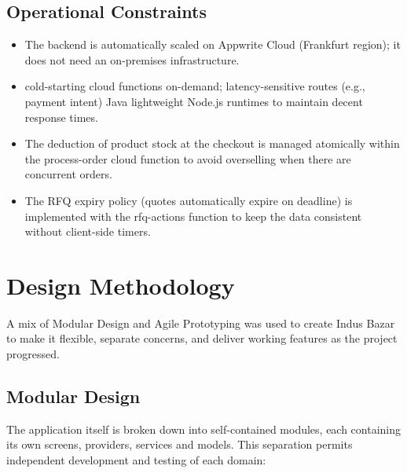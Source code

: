 \subsection{Operational Constraints}
\begin{itemize}
    \item The backend is automatically scaled on Appwrite Cloud (Frankfurt region); it does not need an on-premises infrastructure.
    \item cold-starting cloud functions on-demand; latency-sensitive routes (e.g., payment intent) Java lightweight Node.js runtimes to maintain decent response times.
    \item The deduction of product stock at the checkout is managed atomically within the process-order cloud function to avoid overselling when there are concurrent orders.
    \item The RFQ expiry policy (quotes automatically expire on deadline) is implemented with the rfq-actions function to keep the data consistent without client-side timers.
\end{itemize}

\section{Design Methodology}

A mix of Modular Design and Agile Prototyping was used to create Indus Bazar to make it flexible, separate concerns, and deliver working features as the project progressed.

\subsection{Modular Design}

The application itself is broken down into self-contained modules, each containing its own screens, providers, services and models. This separation permits independent development and testing of each domain:

